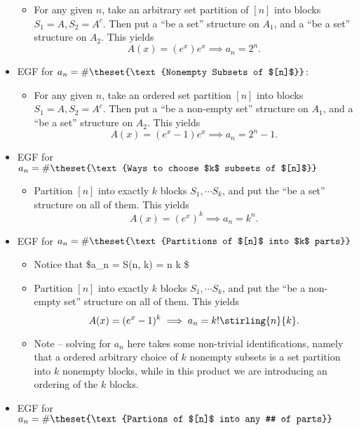 \begin{itemize}
  \begin{itemize}
  \tightlist
  \item
    For any given \(n\), take an arbitrary set partition of \([n]\) into
    blocks \(S_1 = A, S_2 = A^c\). Then put a ``be a set'' structure on
    \(A_1\), and a ``be a set'' structure on \(A_2\). This yields
    \[A(x) = (e^x)e^x \implies a_n = 2^n.\]
  \end{itemize}
\item
  EGF for \(a_n = \#\theset{\text{Nonempty Subsets of $[n]$}}\):

  \begin{itemize}
  \tightlist
  \item
    For any given \(n\), take an ordered set partition \([n]\) into
    blocks \(S_1 = A, S_2 = A^c\). Then put a ``be a non-empty set''
    structure on \(A_1\), and a ``be a set'' structure on \(A_2\). This
    yields \[A(x) = (e^x - 1)e^x \implies a_n = 2^n - 1.\]
  \end{itemize}
\item
  EGF for
  \(a_n = \#\theset{\text{Ways to choose $k$ subsets of $[n]$}}\)

  \begin{itemize}
  \tightlist
  \item
    Partition \([n]\) into exactly \(k\) blocks \(S_1, \cdots S_k\), and
    put the ``be a set'' structure on all of them. This yields
    \[A(x) = (e^x)^k \implies a_n = k^n.\]
  \end{itemize}
\item
  EGF for \(a_n = \#\theset{\text{Partitions of $[n]$ into $k$ parts}}\)

  \begin{itemize}
  \tightlist
  \item
    Notice that \$a\_n = S(n, k) = \stirling n k \$
  \item
    Partition \([n]\) into exactly \(k\) blocks \(S_1, \cdots S_k\), and
    put the ``be a non-empty set'' structure on all of them. This yields
    \[A(x) = (e^x-1)^k \implies a_n = k! \stirling{n}{k}.\]
  \item
    Note -- solving for \(a_n\) here takes some non-trivial
    identifications, namely that a ordered arbitrary choice of \(k\)
    nonempty subsets is a set partition into \(k\) nonempty blocks,
    while in this product we are introducing an ordering of the \(k\)
    blocks.
  \end{itemize}
\item
  EGF for
  \(a_n = \#\theset{\text{Partions of $[n]$ into any # of parts}}\)


\end{itemize}
